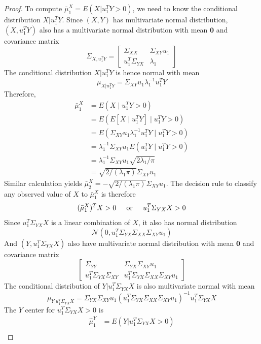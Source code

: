 \documentclass[12pt]{article}
\begin{document}
\begin{proof}
To compute $\bar{\mu}^X_1 = E(X|u^T_1 Y>0)$, we need to know the conditional distribution $X|u^T_1 Y$. Since $(X,Y)$ has multivariate normal distribution, $(X,u^T_1 Y)$ also has a multivariate normal distribution with mean $\mathbf{0}$ and covariance matrix
$$\Sigma_{X,u^T_1 Y}=\begin{bmatrix} \Sigma_{XX} & \Sigma_{XY} u_1 \\  u^T_1 \Sigma_{YX} & \lambda_1 \end{bmatrix}$$
The conditional distribution $X|u^T_1 Y$ is hence normal with mean
 $$\mu_{X|u^T_1 Y} = \Sigma_{XY} u_1 \lambda^{-1}_1 u^T_1 Y $$
Therefore, 
\begin{align}
\bar{\mu}^X_1 &= E(X \mid u^T_1 Y>0) \nonumber \\ \nonumber
 			  &= E\left(E[X \mid u^T_1 Y] \mid u^T_1 Y>0\right) \\ \nonumber
 			  &=  E\left(\Sigma_{XY} u_1 \lambda^{-1}_1 u^T_1 Y \mid u^T_1 Y>0\right)\\ \nonumber
 			  &= \lambda^{-1}_1 \Sigma_{XY}u_1 E(u^T_1 Y \mid u^T_1 Y>0) \\ \nonumber
 			  &= \lambda^{-1}_1 \Sigma_{XY}u_1 \sqrt{2 \lambda_1/\pi} \\ \nonumber
      &= \sqrt{2 / (\lambda_1 \pi)} \Sigma_{XY}u_1
\end{align}
Similar calculation yields $\bar{\mu}^X_2 = -\sqrt{2 / (\lambda_1 \pi)} \Sigma_{XY}u_1$.
The decision rule to classify any observed value of $X$ to $\bar{\mu}^X_1$ is therefore
\[	(\bar{\mu}^X_1)^T X >0	\hspace{0.2in}\text{or} \hspace{0.2in} u^T_1\Sigma_{YX}X>0\] 
Since $u^T_1\Sigma_{YX}X$ is a linear combination of $X$, it also has normal distribution 
\[	\mathcal{N} \left( 0, u^T_1\Sigma_{YX} \Sigma_{XX} \Sigma_{XY} u_1\right)	\]
And $(Y,u^T_1\Sigma_{YX}X)$ also have multivariate normal distribution with mean $\mathbf{0}$ 
and covariance matrix
\[
\begin{bmatrix}
\Sigma_{YY} & \Sigma_{YX}\Sigma_{XY}u_1  \\
u^T_1\Sigma_{YX}\Sigma_{XY} &  u^T_1\Sigma_{YX} \Sigma_{XX} \Sigma_{XY} u_1
\end{bmatrix}
\]
The conditional distribution of $Y|u^T_1\Sigma_{YX}X$ is also multivariate normal with mean 
\[	
\mu_{Y|u^T_1\Sigma_{YX}X } = \Sigma_{YX}\Sigma_{XY}u_1 (u^T_1\Sigma_{YX} \Sigma_{XX} \Sigma_{XY} u_1)^{-1}u^T_1\Sigma_{YX}X	
\]
The $Y$ center for $u^T_1\Sigma_{YX}X>0$ is
\begin{align}
\hat{\mu}^Y_1 &= E(Y|u^T_1\Sigma_{YX}X>0) \nonumber \\ \nonumber

\end{align}
\end{proof}
\end{document}
